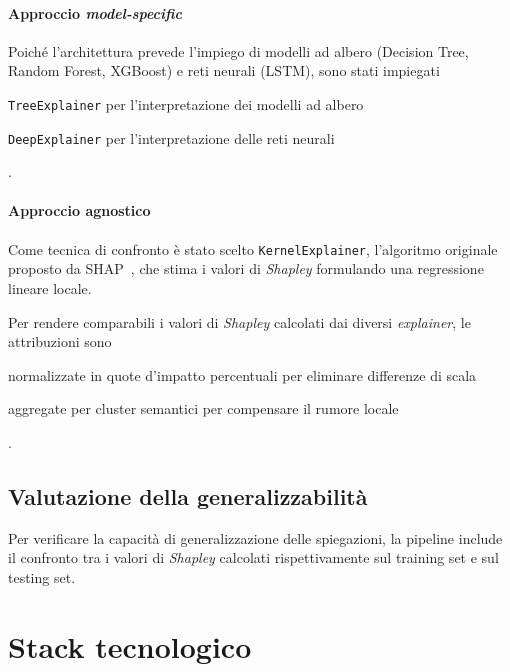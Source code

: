 \paragraph{Approccio \textit{model-specific}}
Poiché l'architettura prevede l'impiego di modelli ad albero (Decision Tree, Random Forest, XGBoost) e reti neurali (LSTM), sono stati impiegati
\begin{enumerate*}[label=(\roman*)]
    \item \texttt{TreeExplainer} per l'interpretazione dei modelli ad albero
    \item \texttt{DeepExplainer} per l'interpretazione delle reti neurali
\end{enumerate*}.

\paragraph{Approccio agnostico}
Come tecnica di confronto è stato scelto \texttt{KernelExplainer}, l'algoritmo originale proposto da SHAP~\cite{xai-shap-lundberg2017}, che stima i valori di \textit{Shapley} formulando una regressione lineare locale.

\medskip
Per rendere comparabili i valori di \textit{Shapley} calcolati dai diversi \textit{explainer}, le attribuzioni sono
\begin{enumerate*}[label=(\roman*)]
    \item normalizzate in quote d'impatto percentuali per eliminare differenze di scala
    \item aggregate per cluster semantici per compensare il rumore locale
\end{enumerate*}.


\subsection{Valutazione della generalizzabilità}
\label{subsec:generalizability_evaluation}
Per verificare la capacità di generalizzazione delle spiegazioni, la pipeline include il confronto tra i valori di \textit{Shapley} calcolati rispettivamente sul training set e sul testing set.

\section{Stack tecnologico}
\label{sec:stack}